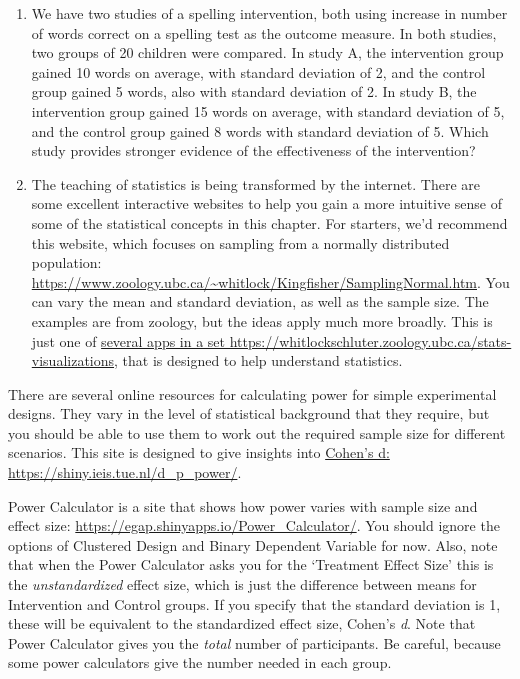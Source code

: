 \documentclass{krantz}
\begin{document}
\begin{enumerate}
\def\labelenumi{\arabic{enumi}.}
\item
  We have two studies of a spelling intervention, both using increase in number of words correct on a spelling test as the outcome measure. In both studies, two groups of 20 children were compared. In study A, the intervention group gained 10 words on average, with standard deviation of 2, and the control group gained 5 words, also with standard deviation of 2. In study B, the intervention group gained 15 words on average, with standard deviation of 5, and the control group gained 8 words with standard deviation of 5. Which study provides stronger evidence of the effectiveness of the intervention?
\item
  The teaching of statistics is being transformed by the internet. There are some excellent interactive websites to help you gain a more intuitive sense of some of the statistical concepts in this chapter. For starters, we'd recommend this website, which focuses on sampling from a normally distributed population: \url{https://www.zoology.ubc.ca/~whitlock/Kingfisher/SamplingNormal.htm}. You can vary the mean and standard deviation, as well as the sample size. The examples are from zoology, but the ideas apply much more broadly. This is just one of \href{https://whitlockschluter.zoology.ubc.ca/stats-visualizations}{several apps in a set https://whitlockschluter.zoology.ubc.ca/stats-visualizations}, that is designed to help understand statistics.
\end{enumerate}

There are several online resources for calculating power for simple experimental designs. They vary in the level of statistical background that they require, but you should be able to use them to work out the required sample size for different scenarios. This site is designed to give insights into \href{https://shiny.ieis.tue.nl/d_p_power/}{Cohen's d: https://shiny.ieis.tue.nl/d\_p\_power/}.

Power Calculator is a site that shows how power varies with sample size and effect size: \url{https://egap.shinyapps.io/Power_Calculator/}. You should ignore the options of Clustered Design and Binary Dependent Variable for now. Also, note that when the Power Calculator asks you for the `Treatment Effect Size' this is the \emph{unstandardized} effect size, which is just the difference between means for Intervention and Control groups. If you specify that the standard deviation is 1, these will be equivalent to the standardized effect size, Cohen's \emph{d}. Note that Power Calculator gives you the \emph{total} number of participants. Be careful, because some power calculators give the number needed in each group.
\end{document}
